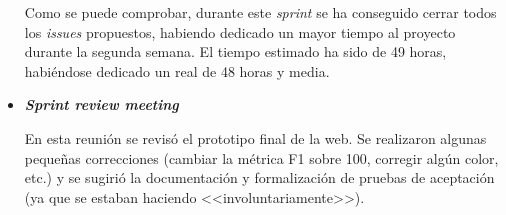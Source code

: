 \begin{itemize}
	Como se puede comprobar, durante este \textit{sprint} se ha conseguido cerrar todos los \textit{issues} propuestos, habiendo dedicado un mayor tiempo al proyecto durante la segunda semana. El tiempo estimado ha sido de 49 horas, habiéndose dedicado un real de 48 horas y media.
	
	\item \textbf{\textit{Sprint review meeting}}
	
	En esta reunión se revisó el prototipo final de la web. Se realizaron algunas pequeñas correcciones (cambiar la métrica F1 sobre 100, corregir algún color, etc.) y se sugirió la documentación y formalización de pruebas de aceptación (ya que se estaban haciendo <<involuntariamente>>).
	
\end{itemize}


